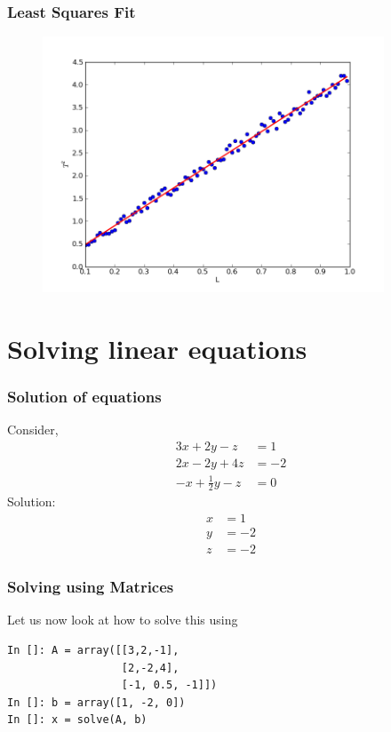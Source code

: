 \documentclass[14pt,compress]{beamer}
\newcommand{\kwrd}[1]{ \texttt{\textbf{\color{blue}{#1}}}  }
\begin{document}
\begin{frame}[fragile]
\frametitle{Least Squares Fit}
\vspace{-0.15in}
\begin{figure}
\includegraphics[width=4in]{data/least-sq-fit}
\end{figure}
\end{frame}

\section{Solving linear equations}

\begin{frame}[fragile]
\frametitle{Solution of equations}
Consider,
  \begin{align*}
    3x + 2y - z  & = 1 \\
    2x - 2y + 4z  & = -2 \\
    -x + \frac{1}{2}y -z & = 0
  \end{align*}
Solution:
  \begin{align*}
    x & = 1 \\
    y & = -2 \\
    z & = -2
  \end{align*}
\end{frame}

\begin{frame}[fragile]
\frametitle{Solving using Matrices}
Let us now look at how to solve this using \kwrd{matrices}
  \begin{lstlisting}
In []: A = array([[3,2,-1],
                  [2,-2,4],                   
                  [-1, 0.5, -1]])
In []: b = array([1, -2, 0])
In []: x = solve(A, b)
  \end{lstlisting}
\end{frame}
\end{document}
